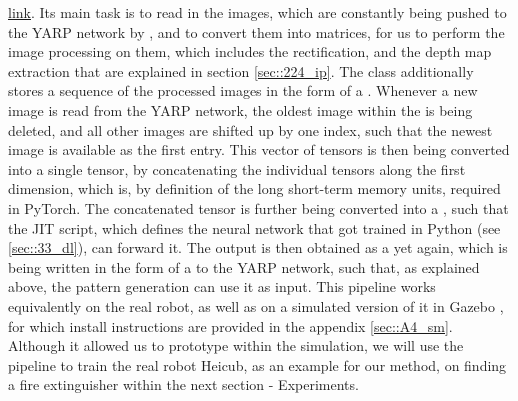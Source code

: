 \href{https://github.com/mhubii/nmpc_pattern_generator/blob/719fde0bb73925923de85cbf379c5523e075dfeb/src/behavioural_augmentation_real_robot_external_data.cpp#L108}{\underline{link}}. Its main task is to read in the images, which are constantly being pushed to the YARP network by , and to convert them into  matrices, for us to perform the image processing on them, which includes the rectification, and the depth map extraction that are explained in section \ref{sec::224_ip}. The  class additionally stores a sequence of the processed images in the form of a . Whenever a new image is read from the YARP network, the oldest image within the  is being deleted, and all other images are shifted up by one index, such that the newest image is available as the first entry. This vector of tensors is then being converted into a single tensor, by concatenating the individual tensors along the first dimension, which is, by definition of the long short-term memory units, required in PyTorch. The concatenated tensor is further being converted into a , such that the JIT script, which defines the neural network that got trained in Python (see \ref{sec::33_dl}), can forward it. The output is then obtained as a  yet again, which is being written in the form of a  to the YARP network, such that,  as explained above, the pattern generation can use it as input. This pipeline works equivalently on the real robot, as well as on a simulated version of it in Gazebo \cite{koenig2004design}, for which install instructions are provided in the appendix \ref{sec::A4_sm}. Although it allowed us to prototype within the simulation, we will use the pipeline to train the real robot Heicub, as an example for our method, on finding a fire extinguisher within the next section - Experiments.